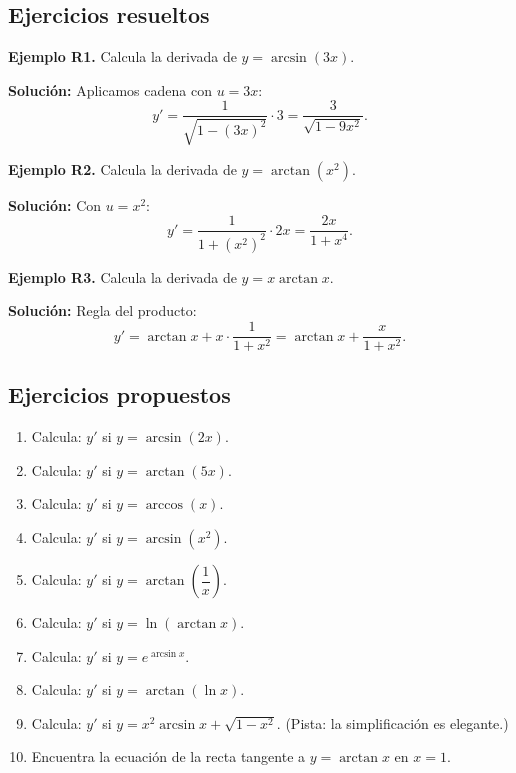 \documentclass[12pt, letterpaper]{article}
\begin{document}
\subsection{Ejercicios resueltos}

\textbf{Ejemplo R1.} Calcula la derivada de $y = \arcsin(3x)$.

\begin{cuadrosolucion}
  \textbf{Solución:} Aplicamos cadena con $u = 3x$:
  $$y' = \frac{1}{\sqrt{1 - (3x)^2}} \cdot 3 = \frac{3}{\sqrt{1 - 9x^2}}.$$
\end{cuadrosolucion}

\textbf{Ejemplo R2.} Calcula la derivada de $y = \arctan(x^2)$.

\begin{cuadrosolucion}
  \textbf{Solución:} Con $u = x^2$:
  $$y' = \frac{1}{1 + (x^2)^2} \cdot 2x = \frac{2x}{1 + x^4}.$$
\end{cuadrosolucion}

\textbf{Ejemplo R3.} Calcula la derivada de $y = x \arctan x$.

\begin{cuadrosolucion}
  \textbf{Solución:} Regla del producto:
  $$y' = \arctan x + x \cdot \frac{1}{1 + x^2} = \arctan x + \frac{x}{1 + x^2}.$$
\end{cuadrosolucion}


\subsection{Ejercicios propuestos}

\begin{enumerate}[resume=ejercicios, leftmargin=*]
  \item \facil{} Calcula: $y'$ si $y = \arcsin(2x)$.
  \item \facil{} Calcula: $y'$ si $y = \arctan(5x)$.
  \item \facil{} Calcula: $y'$ si $y = \arccos(x)$.
  \item \medio{} Calcula: $y'$ si $y = \arcsin(x^2)$.
  \item \medio{} Calcula: $y'$ si $y = \arctan\left(\dfrac{1}{x}\right)$.
  \item \medio{} Calcula: $y'$ si $y = \ln(\arctan x)$.
  \item \medio{} Calcula: $y'$ si $y = e^{\arcsin x}$.
  \item \dificil{} Calcula: $y'$ si $y = \arctan(\ln x)$.
  \item \dificil{} Calcula: $y'$ si $y = x^2 \arcsin x + \sqrt{1 - x^2}$. (Pista: la simplificación es elegante.)
  \item \dificil{} Encuentra la ecuación de la recta tangente a $y = \arctan x$ en $x = 1$.
\end{enumerate}
\end{document}
